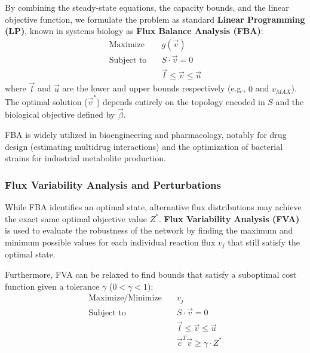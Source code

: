 By combining the steady-state equations, the capacity bounds, and the linear objective function, we formulate the problem as standard \textbf{Linear Programming (LP)}, known in systems biology as \textbf{Flux Balance Analysis (FBA)}:
\begin{align*}
    \text{Maximize} \quad   & g(\vec{v})                        \\
    \text{Subject to} \quad & S \cdot \vec{v} = 0               \\
                            & \vec{l} \leq \vec{v} \leq \vec{u}
\end{align*}
where \(\vec{l}\) and \(\vec{u}\) are the lower and upper bounds respectively (e.g., \(0\) and \(v_{MAX}\)). The optimal solution (\(\vec{v}^*\)) depends entirely on the topology encoded in \(S\) and the biological objective defined by \(\vec{\beta}\).


FBA is widely utilized in bioengineering and pharmacology, notably for drug design (estimating multidrug interactions) and the optimization of bacterial strains for industrial metabolite production.

\subsubsection{Flux Variability Analysis and Perturbations}
\label{subsubsec:fva_perturbations}

While FBA identifies an optimal state, alternative flux distributions may achieve the exact same optimal objective value \(Z^*\). \textbf{Flux Variability Analysis (FVA)} is used to evaluate the robustness of the network by finding the maximum and minimum possible values for each individual reaction flux \(v_j\) that still satisfy the optimal state.

Furthermore, FVA can be relaxed to find bounds that satisfy a suboptimal cost function given a tolerance \(\gamma\) (\(0 < \gamma < 1\)):
\begin{align*}
    \text{Maximize/Minimize} \quad & v_j                                     \\
    \text{Subject to} \quad        & S \cdot \vec{v} = 0                     \\
                                   & \vec{l} \leq \vec{v} \leq \vec{u}       \\
                                   & \vec{c}^T \vec{v} \geq \gamma \cdot Z^*
\end{align*}

